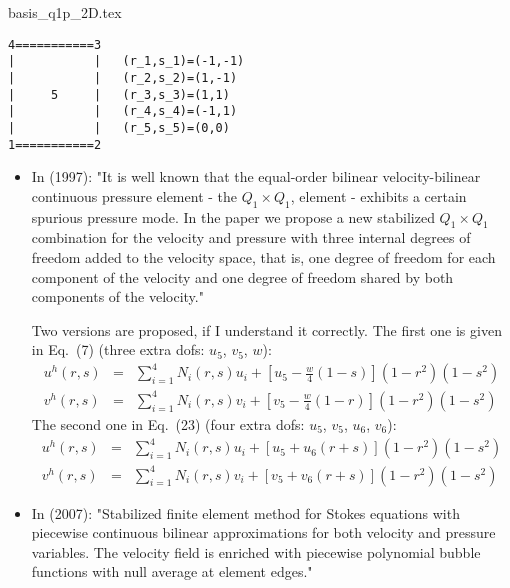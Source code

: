 \begin{flushright} {\tiny {\color{gray} basis\_q1p\_2D.tex}} \end{flushright}

\begin{verbatim}
4===========3
|           |   (r_1,s_1)=(-1,-1)
|           |   (r_2,s_2)=(1,-1)
|     5     |   (r_3,s_3)=(1,1)
|           |   (r_4,s_4)=(-1,1)
|           |   (r_5,s_5)=(0,0)
1===========2
\end{verbatim}

\begin{itemize}
\item 
In \textcite{bai97} (1997): "It is well known that the equal-order bilinear velocity-bilinear 
continuous pressure element - the $Q_1\times Q_1$, element - exhibits a certain spurious pressure mode.
In the paper we propose a new stabilized $Q_1\times Q_1$ combination for the velocity and
pressure with three internal degrees of freedom added to the velocity space, that is, one degree of
freedom for each component of the velocity and one degree of freedom shared by both components of
the velocity."

Two versions are proposed, if I understand it correctly.
The first one is given in Eq.~(7) (three extra dofs: $u_5$, $v_5$, $w$):
\begin{eqnarray}
u^h(r,s) &=& \sum_{i=1}^4 N_i (r,s) u_i + \left[ u_5 - \frac{w}{4}(1-s) \right] (1-r^2)(1-s^2) \nonumber\\
v^h(r,s) &=& \sum_{i=1}^4 N_i (r,s) v_i + \left[ v_5 - \frac{w}{4}(1-r) \right] (1-r^2)(1-s^2) 
\end{eqnarray}
The second one in Eq.~(23) (four extra dofs: $u_5$, $v_5$, $u_6$, $v_6$):
\begin{eqnarray}
u^h(r,s) &=& \sum_{i=1}^4 N_i (r,s) u_i + \left[ u_5 +u_6(r+s) \right] (1-r^2)(1-s^2) \nonumber\\
v^h(r,s) &=& \sum_{i=1}^4 N_i (r,s) v_i + \left[ v_5 +v_6(r+s) \right] (1-r^2)(1-s^2) 
\end{eqnarray}

\item In \textcite{fros07} (2007): 
"Stabilized finite element method for Stokes equations with piecewise continuous 
bilinear approximations for both velocity and pressure variables. The velocity
field is enriched with piecewise polynomial bubble functions with null average at element
edges."


\end{itemize}
